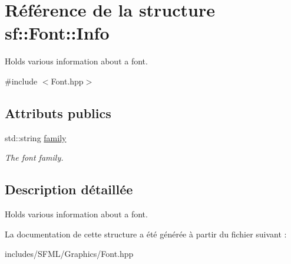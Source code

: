 \hypertarget{structsf_1_1Font_1_1Info}{}\section{Référence de la structure sf\+:\+:Font\+:\+:Info}
\label{structsf_1_1Font_1_1Info}


Holds various information about a font.  




{\ttfamily \#include $<$Font.\+hpp$>$}

\subsection*{Attributs publics}
\begin{DoxyCompactItemize}
\item 
\mbox{\label{structsf_1_1Font_1_1Info_a008413b4b6cf621eb92668a11098a519}} 
std\+::string \hyperlink{structsf_1_1Font_1_1Info_a008413b4b6cf621eb92668a11098a519}{family}
\begin{DoxyCompactList}\small\item\em The font family. \end{DoxyCompactList}\end{DoxyCompactItemize}


\subsection{Description détaillée}
Holds various information about a font. 

La documentation de cette structure a été générée à partir du fichier suivant \+:\begin{DoxyCompactItemize}
\item 
includes/\+S\+F\+M\+L/\+Graphics/Font.\+hpp\end{DoxyCompactItemize}
